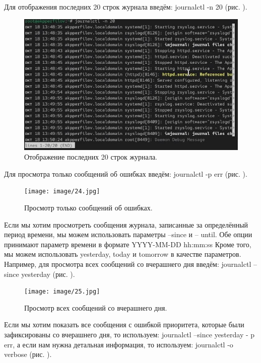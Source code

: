 \documentclass[
  english,
  russian,
  12pt,
  a4paper,
  DIV=11,
  numbers=noendperiod]{scrreprt}
\begin{document}
Для отображения последних 20 строк журнала введём: journalctl -n 20
(рис. \autocite*{fig:023}).

\begin{figure}

{\centering \includegraphics[width=0.7\linewidth,height=\textheight,keepaspectratio]{image/23(1).jpg}

}

\caption{Отображение последних 20 строк журнала.}

\end{figure}%

Для просмотра только сообщений об ошибках введём: journalctl -p err
(рис. \autocite*{fig:024}).

\begin{figure}

{\centering \texttt{[image: image/24.jpg]}

}

\caption{Просмотр только сообщений об ошибках.}

\end{figure}%

Если мы хотим просмотреть сообщения журнала, записанные за определённый
период времени, мы можем использовать параметры --since и -- until. Обе
опции принимают параметр времени в формате YYYY-MM-DD hh:mm:ss Кроме
того, мы можем использовать yesterday, today и tomorrow в качестве
параметров. Например, для просмотра всех сообщений со вчерашнего дня
введём: journalctl --since yesterday (рис. \autocite*{fig:025}).

\begin{figure}

{\centering \texttt{[image: image/25.jpg]}

}

\caption{Просмотр всех сообщений со вчерашнего дня.}

\end{figure}%

Если мы хотим показать все сообщения с ошибкой приоритета, которые были
зафиксированы со вчерашнего дня, то используем: journalctl --since
yesterday - p err, а если нам нужна детальная информация, то используем:
journalctl -o verbose (рис. \autocite*{fig:026}).
\end{document}
